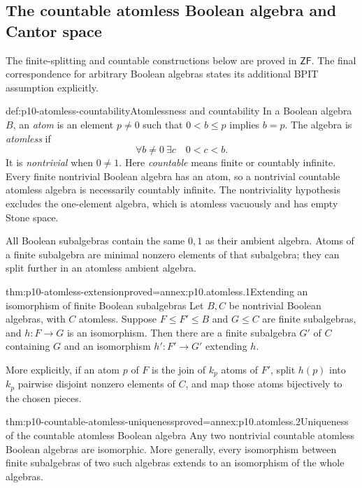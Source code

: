 
\subsection{The countable atomless Boolean algebra and Cantor space}
\label{sec:p10-countable-atomless}

The finite-splitting and countable constructions below are proved in
\(\mathsf{ZF}\). The final correspondence for arbitrary Boolean
algebras states its additional BPIT assumption explicitly.

\begin{hbdefinition}{def:p10-atomless-countability}{Atomlessness and countability}
In a Boolean algebra \(B\), an \emph{atom} is an element \(p\ne0\)
such that \(0<b\leq p\) implies \(b=p\).
The algebra is \emph{atomless} if
\[
 \forall b\ne0\ \exists c\quad 0<c<b.
\]
It is \emph{nontrivial} when \(0\ne1\).
Here \emph{countable} means finite or countably infinite.
Every finite nontrivial Boolean algebra has an atom, so a nontrivial
countable atomless algebra is necessarily countably infinite.
The nontriviality hypothesis excludes the one-element algebra, which
is atomless vacuously and has empty Stone space.

All Boolean subalgebras contain the same \(0,1\) as their ambient
algebra.  Atoms of a finite subalgebra are minimal nonzero elements
of that subalgebra; they can split further in an atomless ambient
algebra.
\end{hbdefinition}

\begin{hbtheorem}{thm:p10-atomless-extension}{proved=annex:p10.atomless.1}{Extending an isomorphism of finite Boolean subalgebras}
Let \(B,C\) be nontrivial Boolean algebras, with \(C\) atomless.
Suppose \(F\leq F'\leq B\) and \(G\leq C\) are finite subalgebras,
and \(h:F\to G\) is an isomorphism.
Then there are a finite subalgebra \(G'\) of \(C\) containing \(G\)
and an isomorphism \(h':F'\to G'\) extending \(h\).

More explicitly, if an atom \(p\) of \(F\) is the join of \(k_p\)
atoms of \(F'\), split \(h(p)\) into \(k_p\) pairwise disjoint
nonzero elements of \(C\), and map those atoms bijectively to the
chosen pieces.
\end{hbtheorem}

\begin{hbtheorem}{thm:p10-countable-atomless-uniqueness}{proved=annex:p10.atomless.2}{Uniqueness of the countable atomless Boolean algebra}
Any two nontrivial countable atomless Boolean algebras are isomorphic.
More generally, every isomorphism between finite subalgebras of two
such algebras extends to an isomorphism of the whole algebras.
\end{hbtheorem}

